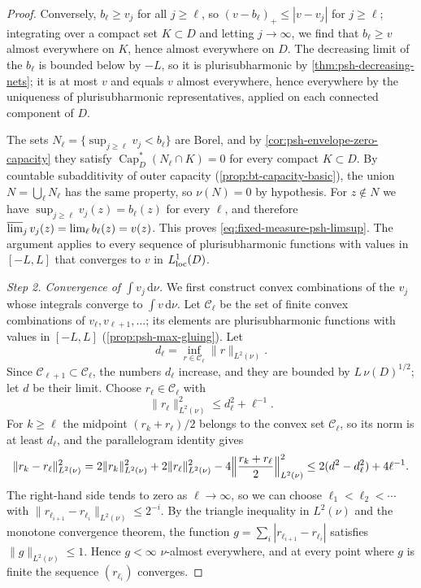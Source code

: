 \begin{proof}
Conversely, $b_\ell\ge v_j$ for all $j\ge\ell$, so $(v-b_\ell)_+\le|v-v_j|$ for $j\ge\ell$; integrating over a compact set $K\subset D$ and letting $j\to\infty$, we find that $b_\ell\ge v$ almost everywhere on $K$, hence almost everywhere on $D$. The decreasing limit of the $b_\ell$ is bounded below by $-L$, so it is plurisubharmonic by \cref{thm:psh-decreasing-nets}; it is at most $v$ and equals $v$ almost everywhere, hence everywhere by the uniqueness of plurisubharmonic representatives, applied on each connected component of $D$.

The sets $N_\ell=\{\sup_{j\ge\ell}v_j<b_\ell\}$ are Borel, and by \cref{cor:psh-envelope-zero-capacity} they satisfy $\operatorname{Cap}_D^*(N_\ell\cap K)=0$ for every compact $K\subset D$. By countable subadditivity of outer capacity (\cref{prop:bt-capacity-basic}), the union $N=\bigcup_\ell N_\ell$ has the same property, so $\nu(N)=0$ by hypothesis. For $z\notin N$ we have $\sup_{j\ge\ell}v_j(z)=b_\ell(z)$ for every $\ell$, and therefore $\varlimsup_jv_j(z)=\lim_\ell b_\ell(z)=v(z)$. This proves \eqref{eq:fixed-measure-psh-limsup}. The argument applies to every sequence of plurisubharmonic functions with values in $[-L,L]$ that converges to $v$ in $L^1_{\mathrm{loc}}(D)$.

\emph{Step 2. Convergence of $\int v_j\,\mathrm d\nu$.} We first construct convex combinations of the $v_j$ whose integrals converge to $\int v\,\mathrm d\nu$. Let $\mathcal C_\ell$ be the set of finite convex combinations of $v_\ell,v_{\ell+1},\ldots$; its elements are plurisubharmonic functions with values in $[-L,L]$ (\cref{prop:psh-max-gluing}). Let
\[
 d_\ell=\inf_{r\in\mathcal C_\ell}\|r\|_{L^2(\nu)}.
\]
Since $\mathcal C_{\ell+1}\subset\mathcal C_\ell$, the numbers $d_\ell$ increase, and they are bounded by $L\,\nu(D)^{1/2}$; let $d$ be their limit. Choose $r_\ell\in\mathcal C_\ell$ with
\[
 \|r_\ell\|_{L^2(\nu)}^2\leq d_\ell^2+\ell^{-1}.
\]
For $k\geq\ell$ the midpoint $(r_k+r_\ell)/2$ belongs to the convex set $\mathcal C_\ell$, so its norm is at least $d_\ell$, and the parallelogram identity gives
\[
 \|r_k-r_\ell\|_{L^2(\nu)}^2
 =2\|r_k\|_{L^2(\nu)}^2+2\|r_\ell\|_{L^2(\nu)}^2-4\Bigl\|\frac{r_k+r_\ell}2\Bigr\|_{L^2(\nu)}^2
 \leq2(d^2-d_\ell^2)+4\ell^{-1}.
\]
The right-hand side tends to zero as $\ell\to\infty$, so we can choose $\ell_1<\ell_2<\cdots$ with $\|r_{\ell_{i+1}}-r_{\ell_i}\|_{L^2(\nu)}\le2^{-i}$. By the triangle inequality in $L^2(\nu)$ and the monotone convergence theorem, the function $g=\sum_i|r_{\ell_{i+1}}-r_{\ell_i}|$ satisfies $\|g\|_{L^2(\nu)}\le1$. Hence $g<\infty$ $\nu$-almost everywhere, and at every point where $g$ is finite the sequence $(r_{\ell_i})$ converges.


\end{proof}
